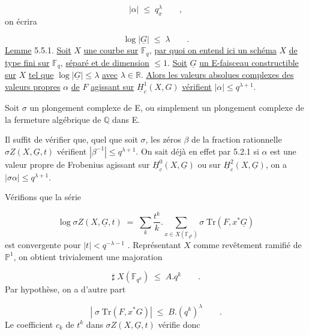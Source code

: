 \begin{equation*}
|\alpha| \;\leqslant\; q_x^{\lambda} \qquad ,
\end{equation*}
on écrira

\begin{equation*}
\log |\underline{G}| \;\leqslant\; \lambda \qquad .
\end{equation*}
\underline{Lemme} 5.5.1. \underline{Soit} $X$ \underline{une courbe sur} $\mathbb{F}_q$, \underline{par quoi on entend ici un schéma} $X$ \underline{de type fini sur} $\mathbb{F}_q$, \underline{séparé et de dimension} $\leqslant 1$. \underline{Soit} $\underline{G}$ \underline{un E-faisceau constructible sur} $X$ \underline{tel que} $\log |\underline{G}| \leqslant \lambda$ \underline{avec} $\lambda \in \mathbb{R}$. \underline{Alors les valeurs absolues complexes des valeurs propres} $\alpha$ \underline{de} $F$ \underline{agissant sur} $\underline{H}^1_c(X,G)$ \underline{vérifient} $|\alpha| \leqslant q^{\lambda+1}$.

Soit $\sigma$ un plongement complexe de E, ou simplement un plongement complexe de la fermeture algébrique de $\mathbb{Q}$ dans E.

Il suffit de vérifier que, quel que soit $\sigma$, les zéros $\beta$ de la fraction rationnelle $\sigma Z(X,\underline{G},t)$ vérifient $|\beta^{-1}| \leqslant q^{\lambda+1}$. On sait déjà en
effet par 5.2.1 si $\alpha$ est une valeur propre de Frobenius agissant sur $\underline{H}^0_c(X,\underline{G})$ ou sur $\underline{H}^2_c(X,\underline{G})$, on a $|\sigma \alpha| \leqslant q^{\lambda+1}$.

Vérifions que la série

\begin{equation*}
\log \sigma Z(X,\underline{G},t) \;=\; \sum_k \frac{t^k}{k} . \sum_{x \in X(\mathbb{F}_{q^k})} \sigma \; \mathrm{Tr}(F,x^*\underline{G})
\end{equation*}
est convergente pour $|t| < q^{-\lambda-1}$ . Représentant $X$ comme revêtement ramifié de $\mathbb{P}^1$, on obtient trivialement une majoration

\begin{equation*}
\sharp \; X(\mathbb{F}_{q^k}) \;\leqslant\; A.q^k \qquad .
\end{equation*}
Par hypothèse, on a d'autre part

\begin{equation*}
\left| \; \sigma \; \mathrm{Tr}(F,x^*G) \right| \;\leqslant\; B.(q^k)^{\lambda} \qquad .
\end{equation*}
Le coefficient $c_k$ de $t^k$ dans $\sigma Z (X,\underline{G},t)$ vérifie donc

